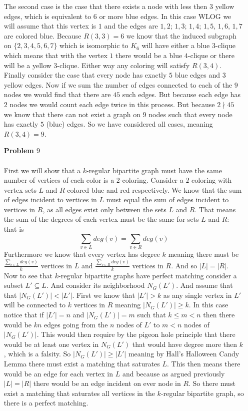 \documentclass[12pt]{amsart}
\theoremstyle{definition}
\newcommand{\se}{\subseteq}
\begin{document}
\begin{itemize}[align=left]
The second case is the case that there exists a node with less then $3$ yellow edges, which is equivalent to $6$ or more blue edges. In this case WLOG we will assume that this vertex is $1$ and the edges are $1,2$; $1,3$; $1,4$; $1,5$, $1,6$, $1,7$ are colored blue. Because $R(3,3)=6$ we know that the induced subgraph on $\{2,3,4,5,6,7\}$ which is isomorphic to $K_6$ will have either a blue $3$-clique which means that with the vertex $1$ there would be a blue $4$-clique or there will be a yellow $3$-clique. Either way any coloring will satisfy $R(3,4)$.\\

Finally consider the case that every node has exactly $5$ blue edges and $3$ yellow edges. Now if we sum the number of edges connected to each of the $9$ nodes we would find that there are $45$ such edges. But because each edge has $2$ nodes we would count each edge twice in this process. But because $2\nmid 45$ we know that there can not exist a graph on $9$ nodes such that every node has exactly $5$ (blue) edges. So we have considered all cases, meaning $R(3,4)=9$.\\

\item[\textbf{Problem $9$}]\;\\\\ %
First we will show that a $k$-regular bipartite graph must have the same number of vertices of each color is a $2$-coloring. Consider a $2$ coloring with vertex sets $L$ and $R$ colored blue and red respectively. We know that the sum of edges incident to vertices in $L$ must equal the sum of edges incident to vertices in $R$, as all edges exist only between the sets $L$ and $R$. That means the sum of the degrees of each vertex must be the same for sets $L$ and $R$: that is 
$$\sum_{v\in L}deg(v)=\sum_{v\in R}deg(v)$$ 
Furthermore we know that every vertex has degree $k$ meaning there must be $\displaystyle{\frac{\sum_{v\in L}deg(v)}{k}}$ vertices in $L$ and $\displaystyle{\frac{\sum_{v\in R}deg(v)}{k}}$ vertices in $R$. And so $|L|=|R|$.\\

Now to see that $k$-regular bipartite graphs have perfect matching consider a subset $L'\se L$. And consider its neighborhood $N_G(L')$. And assume that that $|N_G(L')|< |L'|$. 
First we know that $|L'|>k$ as any single vertex in $L'$ will be connected to $k$ vertices in $R$ meaning $|N_G(L')|\geq k$. In this case notice that if $|L'|=n$ and $|N_G(L')|=m$ such that $k\leq m<n$ then there would be $kn$ edges going from the $n$ nodes of $L'$ to $m<n$ nodes of $|N_G(L')|$. This would then require by the pigeon hole principle that there would be at least one vertex in $N_G(L')$ that would have degree more then $k$, which is a falsity. 
So $|N_G(L')|\geq |L'|$ meaning by Hall's Halloween Candy Lemma there must exist a matching that saturates $L$. This then means there would be an edge for each vertex in $L$ and because as argued previously $|L|=|R|$ there would be an edge incident on ever node in $R$. So there must exist a matching that saturates all vertices in the $k$-regular bipartite graph, so there is a perfect matching.

\end{itemize}
\end{document}
